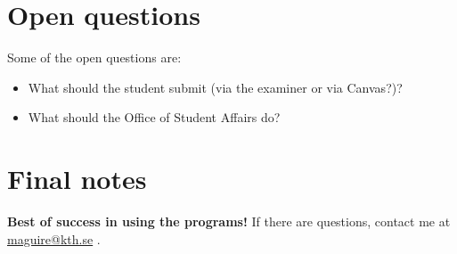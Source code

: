 \section{Open questions}
Some of the open questions are:
\begin{itemize}
    \item What should the student submit (via the examiner or via Canvas?)?
    \item What should the Office of Student Affairs do?
\end{itemize}

\section{Final notes}
\textbf{Best of success in using the programs!} If there are questions, contact me at  \href{mailto:maguire@kth.se}{maguire@kth.se}
.

%
